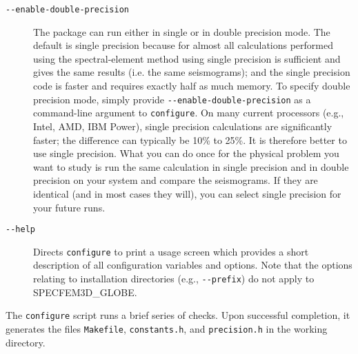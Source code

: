 \begin{description}
\item [{\texttt{-{}-enable-double-precision}}] The package can run either
in single or in double precision mode. The default is single precision
because for almost all calculations performed using the spectral-element method
using single precision is sufficient and gives the same results (i.e. the same seismograms);
and the single precision code is faster and requires exactly half as much memory. To specify
double precision mode, simply provide \texttt{-{}-enable-double-precision}
as a command-line argument to \texttt{configure}.
On many current processors (e.g., Intel, AMD, IBM Power), single precision calculations
are significantly faster; the difference can typically be 10\%
to 25\%. It is therefore better to use single precision.
What you can do once for the physical problem you want to study is run the same calculation in single precision
and in double precision on your system and compare the seismograms.
If they are identical (and in most cases they will), you can select single precision for your future runs.
\item [{\texttt{-{}-help}}] Directs \texttt{configure} to print a usage
screen which provides a short description of all configuration variables
and options. Note that the options relating to installation directories
(e.g., \texttt{-{}-prefix}) do not apply to SPECFEM3D\_GLOBE.
\end{description}
The \texttt{configure} script runs a brief series of checks. Upon
successful completion, it generates the files \texttt{Makefile}, \texttt{constants.h},
and \texttt{precision.h} in the working directory.

